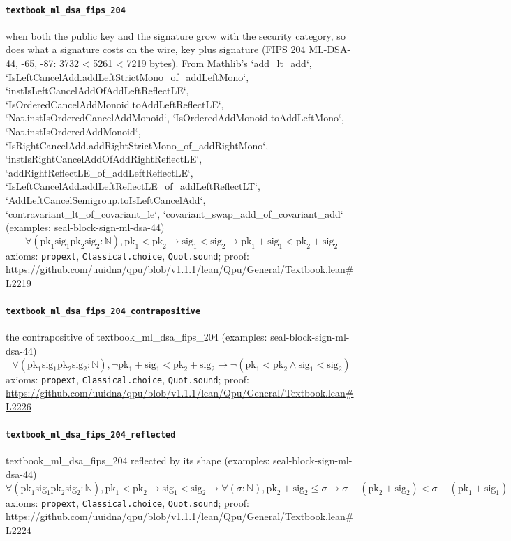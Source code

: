 \documentclass[11pt]{article}
\begin{document}
\paragraph{\texttt{textbook\_ml\_dsa\_fips\_204}}
when both the public key and the signature grow with the security category, so does what a signature costs on the wire, key plus signature (FIPS 204 ML-DSA-44, -65, -87: 3732 < 5261 < 7219 bytes). From Mathlib's `add\_lt\_add`, `IsLeftCancelAdd.addLeftStrictMono\_of\_addLeftMono`, `instIsLeftCancelAddOfAddLeftReflectLE`, `IsOrderedCancelAddMonoid.toAddLeftReflectLE`, `Nat.instIsOrderedCancelAddMonoid`, `IsOrderedAddMonoid.toAddLeftMono`, `Nat.instIsOrderedAddMonoid`, `IsRightCancelAdd.addRightStrictMono\_of\_addRightMono`, `instIsRightCancelAddOfAddRightReflectLE`, `addRightReflectLE\_of\_addLeftReflectLE`, `IsLeftCancelAdd.addLeftReflectLE\_of\_addLeftReflectLT`, `AddLeftCancelSemigroup.toIsLeftCancelAdd`, `contravariant\_lt\_of\_covariant\_le`, `covariant\_swap\_add\_of\_covariant\_add` (examples: seal-block-sign-ml-dsa-44)
\[ \forall (\mathrm{pk}_{1} \mathrm{sig}_{1} \mathrm{pk}_{2} \mathrm{sig}_{2} : \mathbb{N}), \mathrm{pk}_{1} < \mathrm{pk}_{2} \to \mathrm{sig}_{1} < \mathrm{sig}_{2} \to \mathrm{pk}_{1} + \mathrm{sig}_{1} < \mathrm{pk}_{2} + \mathrm{sig}_{2} \]
\noindent axioms: \texttt{propext}, \texttt{Classical.choice}, \texttt{Quot.sound}; proof: \url{https://github.com/uuidna/qpu/blob/v1.1.1/lean/Qpu/General/Textbook.lean\#L2219}

\paragraph{\texttt{textbook\_ml\_dsa\_fips\_204\_contrapositive}}
the contrapositive of textbook\_ml\_dsa\_fips\_204 (examples: seal-block-sign-ml-dsa-44)
\[ \forall (\mathrm{pk}_{1} \mathrm{sig}_{1} \mathrm{pk}_{2} \mathrm{sig}_{2} : \mathbb{N}), \neg \mathrm{pk}_{1} + \mathrm{sig}_{1} < \mathrm{pk}_{2} + \mathrm{sig}_{2} \to \neg (\mathrm{pk}_{1} < \mathrm{pk}_{2} \land \mathrm{sig}_{1} < \mathrm{sig}_{2}) \]
\noindent axioms: \texttt{propext}, \texttt{Classical.choice}, \texttt{Quot.sound}; proof: \url{https://github.com/uuidna/qpu/blob/v1.1.1/lean/Qpu/General/Textbook.lean\#L2226}

\paragraph{\texttt{textbook\_ml\_dsa\_fips\_204\_reflected}}
textbook\_ml\_dsa\_fips\_204 reflected by its shape (examples: seal-block-sign-ml-dsa-44)
\[ \forall (\mathrm{pk}_{1} \mathrm{sig}_{1} \mathrm{pk}_{2} \mathrm{sig}_{2} : \mathbb{N}), \mathrm{pk}_{1} < \mathrm{pk}_{2} \to \mathrm{sig}_{1} < \mathrm{sig}_{2} \to \forall (\sigma : \mathbb{N}), \mathrm{pk}_{2} + \mathrm{sig}_{2} \le \sigma \to \sigma - (\mathrm{pk}_{2} + \mathrm{sig}_{2}) < \sigma - (\mathrm{pk}_{1} + \mathrm{sig}_{1}) \]
\noindent axioms: \texttt{propext}, \texttt{Classical.choice}, \texttt{Quot.sound}; proof: \url{https://github.com/uuidna/qpu/blob/v1.1.1/lean/Qpu/General/Textbook.lean\#L2224}
\end{document}
